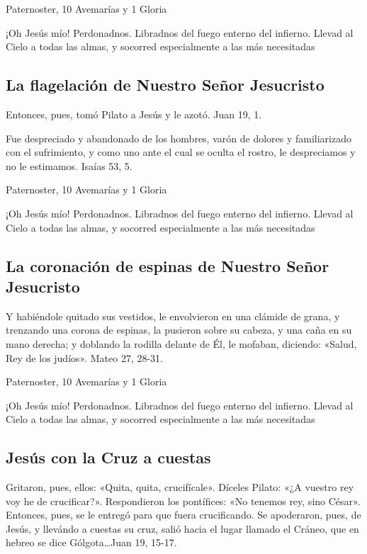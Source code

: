 \documentclass[a4paper,11pt, oneside]{report}
\begin{document}
         Paternoster, 10 Avemarías y 1 Gloria
        
        \medskip
        ¡Oh Jesús mío! Perdonadnos. Libradnos del fuego enterno del infierno. Llevad al Cielo a todas las almas, y socorred especialmente a las más 
        necesitadas
      
      \subsection*{La flagelación de Nuestro Señor Jesucristo}
        Entonces, pues, tomó Pilato a Jesús y le azotó. Juan 19, 1.
        
        \medskip
        Fue despreciado y abandonado de los hombres, varón de dolores y familiarizado con el sufrimiento, y como uno ante el cual
        se oculta el rostro, le despreciamos y no le estimamos. Isaías 53, 5.
        
         Paternoster, 10 Avemarías y 1 Gloria
        
        \medskip
        ¡Oh Jesús mío! Perdonadnos. Libradnos del fuego enterno del infierno. Llevad al Cielo a todas las almas, y socorred especialmente a las más 
        necesitadas
      
      \subsection*{La coronación de espinas de Nuestro Señor Jesucristo}

        Y habiéndole quitado sus vestidos, le envolvieron en una clámide de grana, y trenzando una corona de espinas, la pusieron sobre su cabeza, y una
        caña en su mano derecha; y doblando la rodilla delante de Él, le mofaban, diciendo: «Salud, Rey de los judíos». Mateo 27, 28-31.
        
         Paternoster, 10 Avemarías y 1 Gloria
        
        \medskip
        ¡Oh Jesús mío! Perdonadnos. Libradnos del fuego enterno del infierno. Llevad al Cielo a todas las almas, y socorred especialmente a las más 
        necesitadas
    
      \subsection*{Jesús con la Cruz a cuestas}
        Gritaron, pues, ellos: «Quita, quita, crucifícale». Díceles Pilato: «¿A vuestro rey voy he de crucificar?». Respondieron los pontífices: «No tenemos rey,
        sino César». Entonces, pues, se le entregó para que fuera crucificando. Se apoderaron, pues, de Jesús, y llevándo a cuestas su cruz, salió hacia el lugar
        llamado el Cráneo, que en hebreo se dice Gólgota\ldots Juan 19, 15-17.
\end{document}
